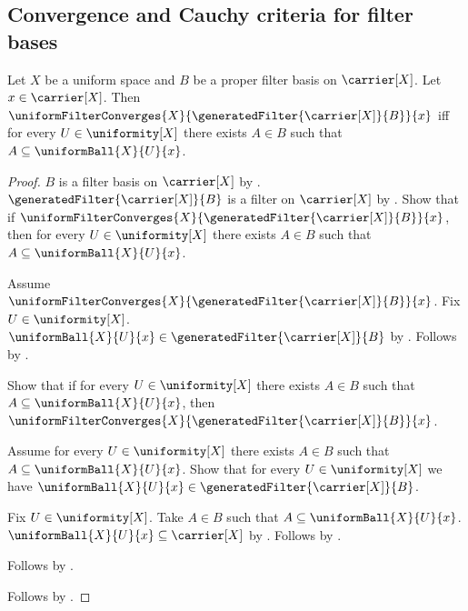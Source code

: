 \subsection{Convergence and Cauchy criteria for filter bases}

\begin{theorem}\label{uniform_generated_filter_convergence_iff}
    Let $X$ be a uniform space and $B$ be a proper filter basis on
        $\carrier[X]$.
    Let $x\in\carrier[X]$.
    Then
        $\uniformFilterConverges{X}
            {\generatedFilter{\carrier[X]}{B}}{x}$ iff
        for every $U\in\uniformity[X]$ there exists $A\in B$ such that
            $A\subseteq\uniformBall{X}{U}{x}$.
\end{theorem}
\begin{proof}
    $B$ is a filter basis on $\carrier[X]$ by
        .
    $\generatedFilter{\carrier[X]}{B}$ is a filter on $\carrier[X]$
        by .
    Show that if
        $\uniformFilterConverges{X}
            {\generatedFilter{\carrier[X]}{B}}{x}$, then
        for every $U\in\uniformity[X]$ there exists $A\in B$ such that
            $A\subseteq\uniformBall{X}{U}{x}$.
    \begin{subproof}
        Assume
            $\uniformFilterConverges{X}
                {\generatedFilter{\carrier[X]}{B}}{x}$.
        Fix $U\in\uniformity[X]$.
        $\uniformBall{X}{U}{x}
            \in\generatedFilter{\carrier[X]}{B}$
            by .
        Follows by .
    \end{subproof}

    Show that if for every $U\in\uniformity[X]$ there exists $A\in B$
        such that $A\subseteq\uniformBall{X}{U}{x}$, then
        $\uniformFilterConverges{X}
            {\generatedFilter{\carrier[X]}{B}}{x}$.
    \begin{subproof}
        Assume for every $U\in\uniformity[X]$ there exists $A\in B$
            such that $A\subseteq\uniformBall{X}{U}{x}$.
        Show that for every $U\in\uniformity[X]$ we have
            $\uniformBall{X}{U}{x}
                \in\generatedFilter{\carrier[X]}{B}$.
        \begin{subproof}
            Fix $U\in\uniformity[X]$.
            Take $A\in B$ such that
                $A\subseteq\uniformBall{X}{U}{x}$.
            $\uniformBall{X}{U}{x}\subseteq\carrier[X]$
                by .
            Follows by .
        \end{subproof}
        Follows by .
    \end{subproof}
    Follows by \auto.
\end{proof}

